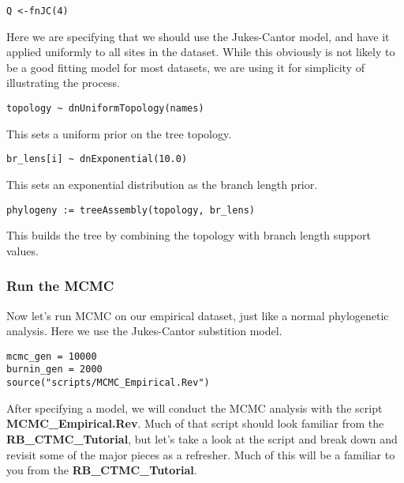{\tt \begin{Snugshade}[184,207,236]
\begin{lstlisting}
Q <-fnJC(4)
\end{lstlisting}
\end{Snugshade}}

Here we are specifying that we should use the Jukes-Cantor model, and have it applied uniformly to all sites in 
the dataset. While this obviously is not likely to be a good fitting model for most datasets, we are using it for 
simplicity of illustrating the process. 

{\tt \begin{Snugshade}[184,207,236]
\begin{lstlisting}
topology ~ dnUniformTopology(names)
\end{lstlisting}
\end{Snugshade}}
This sets a uniform prior on the tree topology.
{\tt \begin{Snugshade}[184,207,236]
\begin{lstlisting}
br_lens[i] ~ dnExponential(10.0)
\end{lstlisting}
\end{Snugshade}}
This sets an exponential distribution as the branch length prior.
{\tt \begin{Snugshade}[184,207,236]
\begin{lstlisting}
phylogeny := treeAssembly(topology, br_lens)
\end{lstlisting}
\end{Snugshade}}
This builds the tree by combining the topology with branch length support values.

\subsubsection{Run the MCMC}

Now let's run MCMC on our empirical dataset, just like
a normal phylogenetic analysis. Here we use the Jukes-Cantor
substition model.
{\tt \begin{Snugshade}[184,207,236]
\begin{lstlisting}
mcmc_gen = 10000
burnin_gen = 2000
source("scripts/MCMC_Empirical.Rev")
\end{lstlisting}
\end{Snugshade}}


After specifying a model, we will conduct the MCMC analysis with the script  \textbf{MCMC\_Empirical.Rev}. 
Much of that script should look familiar from the \textbf{RB\_CTMC\_Tutorial}, but let's take a look at 
the script and break down and revisit some of the major pieces as a refresher. Much of this will be a 
familiar to you from the \textbf{RB\_CTMC\_Tutorial}. 


